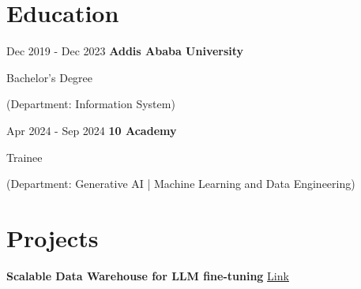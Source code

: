 \documentclass{modern} %
\begin{document}
 

\section{Education}
    
    \begin{twocolentry}{
                \hfill Dec 2019 - Dec 2023
            }
        \textbf{Addis Ababa University}
         
            Bachelor's Degree 
         
        
    \end{twocolentry}
    
            \begin{onecolentry}
            \begin{highlights}
                \hfill (Department: Information System)
            \end{highlights}
        \end{onecolentry}
     

     

    
    
    
    \begin{twocolentry}{
                \hfill Apr 2024 - Sep 2024
            }
        \textbf{10 Academy}
         
            Trainee 
         
        
    \end{twocolentry}
    
            \begin{onecolentry}
            \begin{highlights}
                \hfill (Department: Generative AI | Machine Learning and Data Engineering)
            \end{highlights}
        \end{onecolentry}
     

     

    
    

\section{Projects}
    \begin{onecolentry}
        \textbf{Scalable Data Warehouse for LLM fine{-}tuning}
                    {\href{None}{Link}}

            
            \end{onecolentry}
\end{document}
